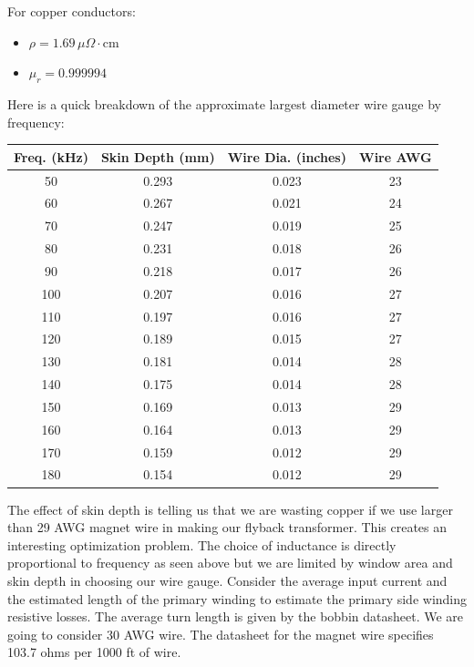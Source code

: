 \documentclass{article}
\begin{document}
For copper conductors:
\begin{itemize}
    \item \(\rho = 1.69 \, \mu\Omega\cdot\text{cm}\)
    \item \(\mu_r = 0.999994\)
\end{itemize}

Here is a quick breakdown of the approximate largest diameter wire gauge by frequency:

    \begin{center}
    \begin{tabular}{|c|c|c|c|}
        \hline
        \textbf{Freq. (kHz)} & \textbf{Skin Depth (mm)} & \textbf{Wire Dia. (inches)} & \textbf{Wire AWG} \\ \hline
        50  & 0.293 & 0.023 & 23 \\ \hline
        60  & 0.267 & 0.021 & 24 \\ \hline
        70  & 0.247 & 0.019 & 25 \\ \hline
        80  & 0.231 & 0.018 & 26 \\ \hline
        90  & 0.218 & 0.017 & 26 \\ \hline
        100 & 0.207 & 0.016 & 27 \\ \hline
        110 & 0.197 & 0.016 & 27 \\ \hline
        120 & 0.189 & 0.015 & 27 \\ \hline
        130 & 0.181 & 0.014 & 28 \\ \hline
        140 & 0.175 & 0.014 & 28 \\ \hline
        150 & 0.169 & 0.013 & 29 \\ \hline
        160 & 0.164 & 0.013 & 29 \\ \hline
        170 & 0.159 & 0.012 & 29 \\ \hline
        180 & 0.154 & 0.012 & 29 \\ \hline
    \end{tabular}
    \end{center}

The effect of skin depth is telling us that we are wasting copper if we use larger than 29 AWG magnet wire in making our flyback transformer.
This creates an interesting optimization problem.  The choice of inductance is directly proportional to frequency as seen above but we are limited by window area and skin depth in choosing our wire gauge.
Consider the average input current and the estimated length of the primary winding to estimate the primary side winding resistive losses.  The average turn length is given by the bobbin datasheet.  We are going to consider 30 AWG wire.  The datasheet for the magnet wire specifies 103.7 ohms per 1000 ft of wire.
\end{document}
